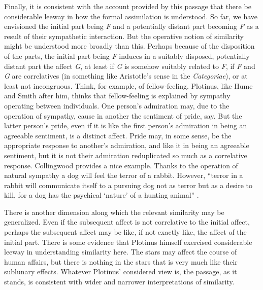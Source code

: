 Finally, it is consistent with the account provided by this passage that there be considerable leeway in how the formal assimilation is understood. So far, we have envisioned the initial part being \emph{F} and a potentially distant part becoming \emph{F} as a result of their sympathetic interaction. But the operative notion of similarity might be understood more broadly than this. Perhaps because of the disposition of the parts, the initial part being \emph{F} induces in a suitably disposed, potentially distant part the affect \emph{G}, at least if \emph{G} is somehow suitably related to \emph{F}, if \emph{F} and \emph{G} are correlatives (in something like Aristotle's sense in the \emph{Categoriae}), or at least not incongruous. Think, for example, of fellow-feeling. Plotinus, like Hume and Smith after him, thinks that fellow-feeling is explained by sympathy operating between individuals. One person's admiration may, due to the operation of sympathy, cause in another the sentiment of pride, say. But the latter person's pride, even if it is like the first person's admiration in being an agreeable sentiment, is a distinct affect. Pride may, in some sense, be the appropriate response to another's admiration, and like it in being an agreeable sentiment, but it is not their admiration reduplicated so much as a correlative response. Collingwood provides a nice example. Thanks to the operation of natural sympathy a dog will feel the terror of a rabbit. However, ``terror in a rabbit will communicate itself to a pursuing dog not as terror but as a desire to kill, for a dog has the psychical `nature' of a hunting animal'' \citep[231]{Collingwood:1938bh}.

There is another dimension along which the relevant similarity may be generalized. Even if the subsequent affect is not correlative to the initial affect, perhaps the subsequent affect may be like, if not exactly like, the affect of the initial part. There is some evidence that Plotinus himself exercised considerable leeway in understanding similarity here. The stars may affect the course of human affairs, but there is nothing in the stars that is very much like their sublunary effects. Whatever Plotinus' considered view is, the passage, as it stands, is consistent with wider and narrower interpretations of similarity.

